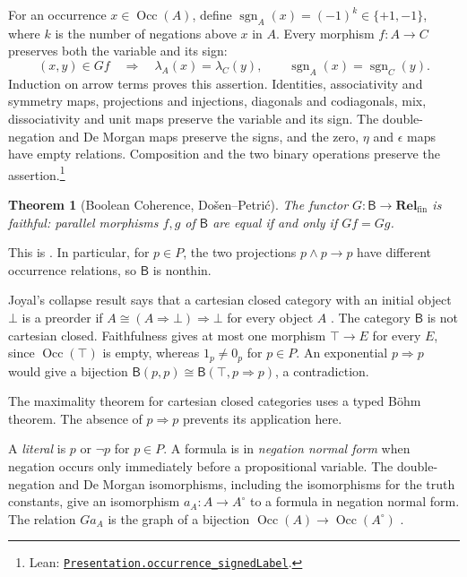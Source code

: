 \documentclass[11pt]{article}
\newtheorem{theorem}{Theorem}[section]
\newcommand{\B}{\mathsf B}
\newcommand{\Occ}{\operatorname{Occ}}
\newcommand{\Rel}{\mathbf{Rel}_{\mathrm{fin}}}
\begin{document}
For an occurrence $x\in\Occ(A)$, define
$\operatorname{sgn}_A(x)=(-1)^k\in\{+1,-1\}$, where $k$ is the
number of negations above $x$ in $A$. Every morphism $f:A\to C$
preserves both the variable and its sign:
\[
 (x,y)\in Gf\quad\Longrightarrow\quad
 \lambda_A(x)=\lambda_C(y),\qquad
 \operatorname{sgn}_A(x)=\operatorname{sgn}_C(y).
\]
Induction on arrow terms proves this assertion. Identities,
associativity and symmetry maps, projections and injections,
diagonals and codiagonals, mix, dissociativity and unit maps
preserve the variable and its sign. The double-negation and
De Morgan maps preserve the signs, and the zero,
$\eta$ and $\epsilon$ maps have empty relations. Composition and
the two binary operations preserve the assertion.\footnote{\raggedright Lean:
\href{https://github.com/flengyel/Dosen-Petric-Maximality/blob/5dbee39bea09539bd130f729e82636419f71f920/DosenPetric/PresentationSignedLabels.lean\#L73}{\texttt{Presentation.\allowbreak{}occurrence\_signedLabel}}.}

\begin{theorem}[Boolean Coherence, Do\v{s}en--Petri\'c]
\label{thm:coherence}
The functor $G:\B\to\Rel$ is faithful: parallel morphisms $f,g$ of
$\B$ are equal if and only if $Gf=Gg$.
\end{theorem}

This is \cite[\S14.2, p.~321]{DP}. In particular, for $p\in P$, the
two projections $p\wedge p\to p$ have different occurrence
relations, so $\B$ is nonthin.

Joyal's collapse result says that a cartesian closed category with
an initial object $\bot$ is a preorder if
$A\cong(A\Rightarrow\bot)\Rightarrow\bot$ for every object $A$
\cite[\S14.3, p.~324]{DP}.
The category $\B$ is not cartesian closed. Faithfulness gives at most
one morphism $\top\to E$ for every $E$, since $\Occ(\top)$ is empty,
whereas $1_p\ne0_p$ for $p\in P$. An exponential $p\Rightarrow p$
would give a bijection $\B(p,p)\cong\B(\top,p\Rightarrow p)$,
a contradiction.

The maximality theorem for cartesian closed categories
\cite[\S11]{DPCCC} uses a typed B\"ohm theorem.
The absence of $p\Rightarrow p$ prevents its application here.

A \emph{literal} is $p$ or $\neg p$ for $p\in P$.
A formula is in \emph{negation normal form} when negation occurs only
immediately before a propositional variable. The double-negation and
De Morgan isomorphisms, including the isomorphisms for the truth
constants, give an isomorphism $a_A:A\to A^\circ$ to a formula in
negation normal form. The relation $Ga_A$ is the graph of a bijection
$\Occ(A)\to\Occ(A^\circ)$
\cite[\S14.1, pp.~313--315]{DP}.
\end{document}
